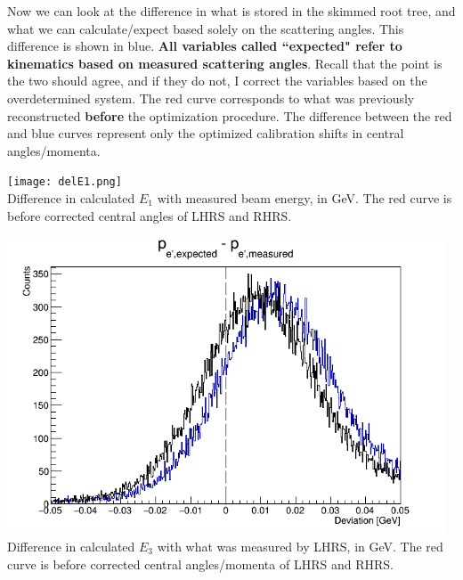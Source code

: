\documentclass{article}
\begin{document}
\clearpage
Now we can look at the difference in what is stored in the skimmed root tree, and what we can calculate/expect based solely on the scattering angles. This difference is shown in blue. \textbf{All variables called ``expected" refer to kinematics based on measured scattering angles}. Recall that the point is the two should agree, and if they do not, I correct the variables based on the overdetermined system. The red curve corresponds to what was previously reconstructed \textbf{before} the optimization procedure. The difference between the red and blue curves represent only the optimized calibration shifts in central angles/momenta.\\

\begin{center}
\texttt{[image: delE1.png]}\\
Difference in calculated $E_1$ with measured beam energy, in GeV. The red curve is before corrected central angles of LHRS and RHRS.
\end{center}

\begin{center}
\includegraphics[width=13cm]{delPe.png}\\
Difference in calculated $E_3$ with what was measured by LHRS, in GeV. The red curve is before corrected central angles/momenta of LHRS and RHRS.
\end{center}
\end{document}
